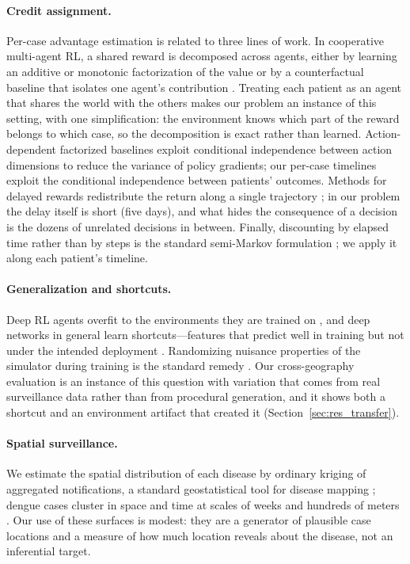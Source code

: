 \documentclass[11pt,a4paper]{article}
\begin{document}
\paragraph{Credit assignment.} Per-case advantage estimation is related to three lines of work. In cooperative multi-agent RL, a shared reward is decomposed across agents, either by learning an additive or monotonic factorization of the value \cite{sunehag2018vdn, rashid2018qmix} or by a counterfactual baseline that isolates one agent's contribution \cite{foerster2018coma}. Treating each patient as an agent that shares the world with the others makes our problem an instance of this setting, with one simplification: the environment knows which part of the reward belongs to which case, so the decomposition is exact rather than learned. Action-dependent factorized baselines \cite{wu2018factorized} exploit conditional independence between action dimensions to reduce the variance of policy gradients; our per-case timelines exploit the conditional independence between patients' outcomes. Methods for delayed rewards redistribute the return along a single trajectory \cite{arjona2019rudder, harutyunyan2019hca}; in our problem the delay itself is short (five days), and what hides the consequence of a decision is the dozens of unrelated decisions in between. Finally, discounting by elapsed time rather than by steps is the standard semi-Markov formulation \cite{bradtke1995smdp}; we apply it along each patient's timeline.

\paragraph{Generalization and shortcuts.} Deep RL agents overfit to the environments they are trained on \cite{cobbe2019generalization, kirk2023survey}, and deep networks in general learn shortcuts---features that predict well in training but not under the intended deployment \cite{geirhos2020shortcut}. Randomizing nuisance properties of the simulator during training is the standard remedy \cite{tobin2017domain}. Our cross-geography evaluation is an instance of this question with variation that comes from real surveillance data rather than from procedural generation, and it shows both a shortcut and an environment artifact that created it (Section~\ref{sec:res_transfer}).

\paragraph{Spatial surveillance.} We estimate the spatial distribution of each disease by ordinary kriging of aggregated notifications, a standard geostatistical tool for disease mapping \cite{diggle1998mbg}; dengue cases cluster in space and time at scales of weeks and hundreds of meters \cite{aldstadt2012spacetime}. Our use of these surfaces is modest: they are a generator of plausible case locations and a measure of how much location reveals about the disease, not an inferential target.
\end{document}
